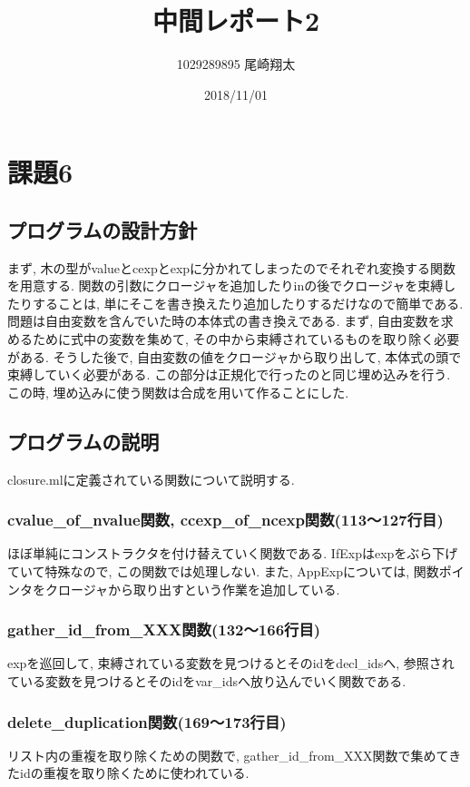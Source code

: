 \documentclass{jarticle}
\begin{document}
\title{中間レポート2}
\author{1029289895 尾崎翔太}
\date{2018/11/01}

\maketitle
\newpage

\section{課題6}
\subsection{プログラムの設計方針}
まず, 木の型がvalueとcexpとexpに分かれてしまったのでそれぞれ変換する関数を用意する. 関数の引数にクロージャを追加したりinの後でクロージャを束縛したりすることは, 単にそこを書き換えたり追加したりするだけなので簡単である. 問題は自由変数を含んでいた時の本体式の書き換えである. まず, 自由変数を求めるために式中の変数を集めて, その中から束縛されているものを取り除く必要がある. そうした後で, 自由変数の値をクロージャから取り出して, 本体式の頭で束縛していく必要がある. この部分は正規化で行ったのと同じ埋め込みを行う. この時, 埋め込みに使う関数は合成を用いて作ることにした.
\subsection{プログラムの説明}
closure.mlに定義されている関数について説明する.
\subsubsection{cvalue\_of\_nvalue関数, ccexp\_of\_ncexp関数(113〜127行目)}
ほぼ単純にコンストラクタを付け替えていく関数である. IfExpはexpをぶら下げていて特殊なので, この関数では処理しない. また, AppExpについては, 関数ポインタをクロージャから取り出すという作業を追加している. 
\subsubsection{gather\_id\_from\_XXX関数(132〜166行目)}
expを巡回して, 束縛されている変数を見つけるとそのidをdecl\_idsへ, 参照されている変数を見つけるとそのidをvar\_idsへ放り込んでいく関数である. 
\subsubsection{delete\_duplication関数(169〜173行目)}
リスト内の重複を取り除くための関数で, gather\_id\_from\_XXX関数で集めてきたidの重複を取り除くために使われている. 
\end{document}
